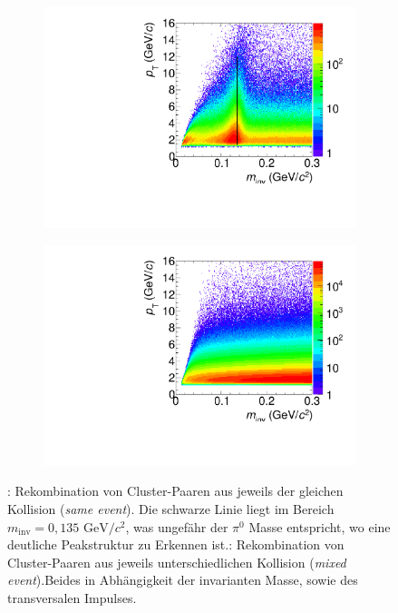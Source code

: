 \documentclass[]{article}
\begin{document}
	\begin{figure}[tbp]
		\centering
		\begin{subfigure}{.5\textwidth}
			\centering
			\includegraphics[width=.95\linewidth]{hInvMass_pT_Signal.pdf}
			\caption{}
			\label{figInvMassPt_a}
		\end{subfigure}%
		\begin{subfigure}{.5\textwidth}
			\centering
			\includegraphics[width=.95\linewidth]{hInvMass_pT_Bkg.pdf}
			\caption{}
			\label{figInvMassPt_b}
		\end{subfigure}
		\caption{: Rekombination von Cluster-Paaren aus jeweils der gleichen Kollision ({\it same event}). Die schwarze Linie liegt im Bereich $m_{\text{inv}}=0,135\text{ GeV/}c^{2}$, was ungef{\"a}hr der $\pi^{0}$ Masse entspricht, wo eine deutliche Peakstruktur zu Erkennen ist.: Rekombination von Cluster-Paaren aus jeweils unterschiedlichen Kollision ({\it mixed event}).\newline Beides in Abh{\"a}ngigkeit der invarianten Masse, sowie des transversalen Impulses.}
		\label{figInvMassPt}
	\end{figure}
\end{document}

